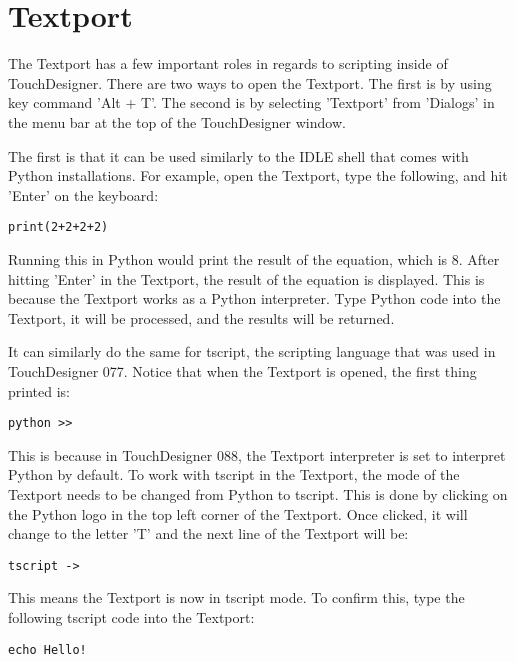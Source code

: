 
\section{Textport}

\begin{fullwidth}
The Textport has a few important roles in regards to scripting inside of TouchDesigner. There are two ways to open the Textport. The first is by using key command 'Alt + T'. The second is by selecting 'Textport' from 'Dialogs' in the menu bar at the top of the TouchDesigner window.

The first is that it can be used similarly to the IDLE shell that comes with Python installations. For example, open the Textport, type the following, and hit 'Enter' on the keyboard:

\begin{lstlisting}
print(2+2+2+2)
\end{lstlisting}

Running this in Python would print the result of the equation, which is 8. After hitting 'Enter' in the Textport, the result of the equation is displayed. This is because the Textport works as a Python interpreter. Type Python code into the Textport, it will be processed, and the results will be returned.

It can similarly do the same for tscript, the scripting language that was used in TouchDesigner 077. Notice that when the Textport is opened, the first thing printed is:

\begin{lstlisting}
python >>
\end{lstlisting}

This is because in TouchDesigner 088, the Textport interpreter is set to interpret Python by default. To work with tscript in the Textport, the mode of the Textport needs to be changed from Python to tscript. This is done by clicking on the Python logo in the top left corner of the Textport. Once clicked, it will change to the letter 'T' and the next line of the Textport will be:

\begin{lstlisting}
tscript ->
\end{lstlisting}

This means the Textport is now in tscript mode. To confirm this, type the following tscript code into the Textport:

\begin{lstlisting}
echo Hello!
\end{lstlisting}


\end{fullwidth}
